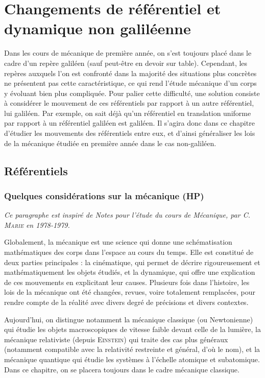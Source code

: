 \documentclass[a4paper,french,bookmarks]{book}
\newcommand{\chaptertoc}[0]{
    \setcounter{tocdepth}{2}
    \begin{tcolorbox}[
        enhanced,
        frame hidden,
        sharp corners,
        detach title,
        spread outwards     = 5pt,
        halign              = center,
        valign              = center,
        borderline west     = {3pt}{0pt}{main20!50!main2!95!gray!90},
        coltitle            = main20!50!main2!95!gray!90, 
        interior style      = {
            left color      = main1white2!65!gray!11,
            middle color    = main1white2!50!gray!10,
            right color     = main1white2!35!gray!9
        },
        arc                 = 0 cm,
        title               = SOMMAIRE,
        boxrule             = 0pt,
        fonttitle           = \bfseries\sffamily,
        overlay             = {
            \node[rotate=90, minimum width=1cm, anchor=south,yshift=-0.8cm]
            at (frame.west) {\tcbtitle};
        }
    ]
        \begin{minipage}{0.83\linewidth}
            \sffamily
            \minitoc
        \end{minipage}
    \end{tcolorbox}
}
\begin{document}
    \chapter{Changements de référentiel et dynamique non galiléenne}
    
    Dans les cours de mécanique de première année, on s'est toujours placé dans le cadre d'un repère galiléen (sauf peut-être en devoir sur table). Cependant, les repères auxquels l'on est confronté dans la majorité des situations plus concrètes ne présentent pas cette caractéristique, ce qui rend l'étude mécanique d'un corps y évoluant bien plus compliquée. Pour palier cette difficulté, une solution consiste à considérer le mouvement de ces référentiels par rapport à un autre référentiel, lui galiléen. Par exemple, on sait déjà qu'un référentiel en translation uniforme par rapport à un référentiel galiléen est galiléen. Il s'agira donc dans ce chapitre d'étudier les mouvements des référentiels entre eux, et d'ainsi généraliser les lois de la mécanique étudiée en première année dans le cas non-galiléen.
    
    \chaptertoc
    
    \section{Référentiels}
    
    \subsection{Quelques considérations sur la mécanique (HP)}
    
    
    \emph{Ce paragraphe est inspiré de \emph{Notes pour l'étude du cours de Mécanique}, par \textsc{C. Marie} en \emph{1978-1979}.}\medskip
    
    Globalement, la mécanique est une science qui donne une schématisation mathématiques des corps dans l'espace au cours du temps. Elle est constitué de deux parties principales : la cinématique, qui permet de décrire rigoureusement et mathématiquement les objets étudiés, et la dynamique, qui offre une explication de ces mouvements en explicitant leur causes. Plusieurs fois dans l'histoire, les lois de la mécanique ont été changées, revues, voire totalement remplacées, pour rendre compte de la réalité avec divers degré de précisions et divers contextes.
    
    Aujourd'hui, on distingue notamment la mécanique classique (ou Newtonienne) qui étudie les objets macroscopiques de vitesse faible devant celle de la lumière, la mécanique relativiste (depuis \textsc{Einstein}) qui traite des cas plus généraux (notamment compatible avec la relativité restreinte et général, d'où le nom), et la mécanique quantique qui étudie les systèmes à l'échelle atomique et subatomique. Dans ce chapitre, on se placera toujours dans le cadre mécanique classique.\medskip
    
\end{document}
